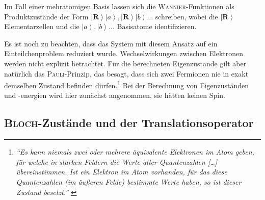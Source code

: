 \documentclass[a4paper, 10pt, twoside, openany]{book} %
\newcommand \ket[1]{\left | #1 \right \rangle}
\def \vec {\boldsymbol}
\begin{document}
Im Fall einer mehratomigen Basis lassen sich die \textsc{Wannier}-Funktionen als Produktzustände der Form $\ket{\vec R} \ket{a}, \ket{\vec R} \ket{b}\dots$ schreiben, wobei die $\ket{\vec R}$ Elementarzellen und die $\ket a, \ket b\dots$ Basisatome identifizieren.

Es ist noch zu beachten, dass das System mit diesem Ansatz auf ein Einteilchenproblem reduziert wurde. Wechselwirkungen zwischen Elektronen werden nicht explizit betrachtet. Für die berechneten Eigenzustände gilt aber natürlich das \textsc{Pauli}-Prinzip, das besagt, dass sich zwei Fermionen nie in exakt demselben Zustand befinden dürfen.\footnote{\emph{"`Es kann niemals zwei oder mehrere äquivalente Elektronen im Atom geben, für welche in starken Feldern die Werte aller Quantenzahlen \emph{[\dots]} übereinstimmen. Ist ein Elektron im Atom vorhanden, für das diese Quantenzahlen (im äußeren Felde) bestimmte Werte haben, so ist dieser Zustand \glq besetzt\grq."'} \cite[S.~776]{Pauli}} Bei der Berechnung von Eigenzuständen und -energien wird hier zunächst angenommen, sie hätten keinen Spin.

\subsection{\textsc{Bloch}-Zustände und der Translationsoperator}
\end{document}
